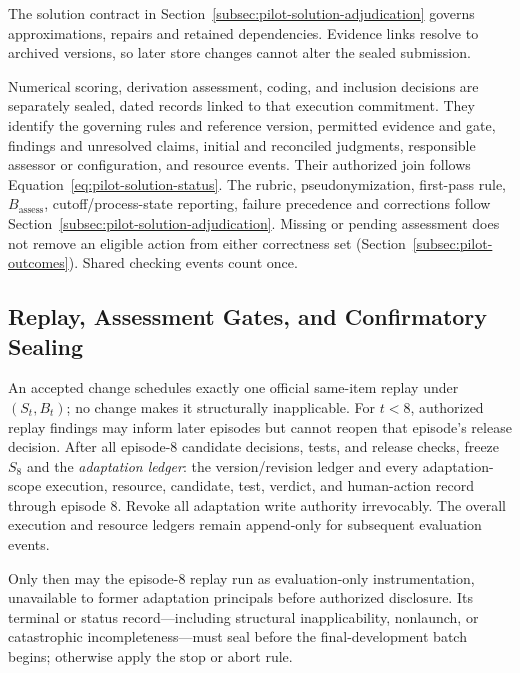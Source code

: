 \documentclass[10pt]{article} %
\providecommand{\1}{\mathbf{1}}  %
\theoremstyle{remark}
\theoremstyle{definition}
\begin{document}
The solution contract in Section~\ref{subsec:pilot-solution-adjudication}
governs approximations, repairs and retained dependencies. Evidence links
resolve to archived versions, so later store changes cannot alter the sealed
submission.

Numerical scoring, derivation assessment, coding, and inclusion decisions
are separately sealed, dated records linked to that execution commitment.
They identify the governing rules and reference version, permitted evidence
and gate, findings and unresolved claims, initial and reconciled judgments,
responsible assessor or configuration, and resource events. Their authorized
join follows Equation~\ref{eq:pilot-solution-status}. The rubric,
pseudonymization, first-pass rule, $B_{\mathrm{assess}}$,
cutoff/process-state reporting, failure precedence and corrections follow
Section~\ref{subsec:pilot-solution-adjudication}. Missing or pending
assessment does not remove an eligible action from either correctness set
(Section~\ref{subsec:pilot-outcomes}). Shared checking events count once.

\subsection{Replay, Assessment Gates, and Confirmatory Sealing}
\label{subsec:execution-confirmatory}

An accepted change schedules exactly one official same-item replay under
$(S_t,B_t)$; no change makes it structurally inapplicable. For $t<8$, authorized
replay findings may inform later episodes but cannot reopen that episode's
release decision. After all episode-8 candidate decisions, tests, and release
checks, freeze $S_8$ and the \emph{adaptation ledger}: the version/revision
ledger and every adaptation-scope execution, resource, candidate, test,
verdict, and human-action record through episode 8. Revoke all adaptation
write authority irrevocably. The overall execution and resource ledgers
remain append-only for subsequent evaluation events.

Only then may the episode-8 replay run as evaluation-only instrumentation,
unavailable to former adaptation principals before authorized disclosure.
Its terminal or status record---including structural inapplicability,
nonlaunch, or catastrophic incompleteness---must seal before the
final-development batch begins; otherwise apply the stop or abort rule.
\end{document}
